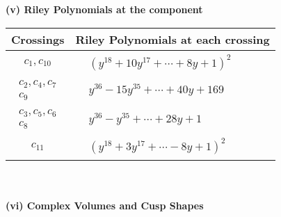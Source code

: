 \documentclass[1p]{elsarticle_modified}
\theoremstyle{definition}
\begin{document}
\newpage\renewcommand{\arraystretch}{1}
\flushleft \textbf{(v) Riley Polynomials at the component}\newline \\
\begin{tabular}{m{50pt}|m{274pt}}
Crossings & \hspace{64pt}Riley Polynomials at each crossing \\
\hline $$\begin{aligned}c_{1},c_{10}\end{aligned}$$&$\begin{aligned}
&(y^{18}+10 y^{17}+\cdots+8 y+1)^{2}
\end{aligned}$\\
\hline $$\begin{aligned}c_{2},c_{4},c_{7}\\c_{9}\end{aligned}$$&$\begin{aligned}
&y^{36}-15 y^{35}+\cdots+40 y+169
\end{aligned}$\\
\hline $$\begin{aligned}c_{3},c_{5},c_{6}\\c_{8}\end{aligned}$$&$\begin{aligned}
&y^{36}- y^{35}+\cdots+28 y+1
\end{aligned}$\\
\hline $$\begin{aligned}c_{11}\end{aligned}$$&$\begin{aligned}
&(y^{18}+3 y^{17}+\cdots-8 y+1)^{2}
\end{aligned}$\\
\hline
\end{tabular}\\~\\
\newpage\flushleft \textbf{(vi) Complex Volumes and Cusp Shapes}
\end{document}

